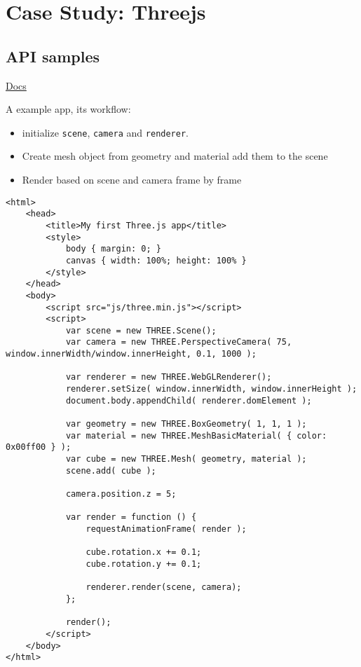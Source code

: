 \section{Case Study: Threejs}\label{case-study-threejs}

\subsection{API samples}\label{api-samples}

\href{http://threejs.org/docs/}{Docs}

A example app, its workflow:

\begin{itemize}
\tightlist
\item
  initialize \texttt{scene}, \texttt{camera} and \texttt{renderer}.
\item
  Create mesh object from geometry and material add them to the scene
\item
  Render based on scene and camera frame by frame
\end{itemize}

\begin{verbatim}
<html>
    <head>
        <title>My first Three.js app</title>
        <style>
            body { margin: 0; }
            canvas { width: 100%; height: 100% }
        </style>
    </head>
    <body>
        <script src="js/three.min.js"></script>
        <script>
            var scene = new THREE.Scene();
            var camera = new THREE.PerspectiveCamera( 75, window.innerWidth/window.innerHeight, 0.1, 1000 );

            var renderer = new THREE.WebGLRenderer();
            renderer.setSize( window.innerWidth, window.innerHeight );
            document.body.appendChild( renderer.domElement );

            var geometry = new THREE.BoxGeometry( 1, 1, 1 );
            var material = new THREE.MeshBasicMaterial( { color: 0x00ff00 } );
            var cube = new THREE.Mesh( geometry, material );
            scene.add( cube );

            camera.position.z = 5;

            var render = function () {
                requestAnimationFrame( render );

                cube.rotation.x += 0.1;
                cube.rotation.y += 0.1;

                renderer.render(scene, camera);
            };

            render();
        </script>
    </body>
</html>
\end{verbatim}

